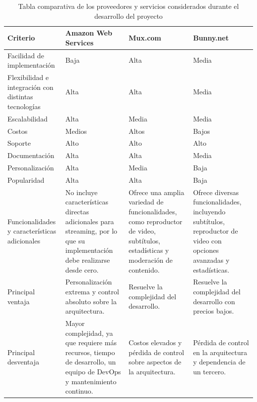 \begin{table}[!htbp]
    \centering
    \footnotesize
    \renewcommand{\arraystretch}{1.5}
    \setlength{\tabcolsep}{6pt}
    \begin{tabularx}{\textwidth}{|>{\Centering\arraybackslash}p{3.8cm}|>{\Centering\arraybackslash}X|>{\Centering\arraybackslash}X|>{\Centering\arraybackslash}X|}
        \hline
        \textbf{Criterio} & \textbf{Amazon Web Services} & \textbf{Mux.com} & \textbf{Bunny.net} \\
        \hline
        Facilidad de implementación & Baja & Alta & Media \\
        \hline
        Flexibilidad e integración con distintas tecnologías & Alta & Alta & Media \\
        \hline
        Escalabilidad & Alta & Media & Media \\
        \hline
        Costos & Medios & Altos & Bajos \\
        \hline
        Soporte & Alto & Alto & Alto \\
        \hline
        Documentación & Alta & Alta & Media \\
        \hline
        Personalización & Alta & Media & Baja \\
        \hline
        Popularidad & Alta & Alta & Baja \\
        \hline
        Funcionalidades y características adicionales 
        & No incluye características directas adicionales para streaming, por lo que su implementación debe realizarse desde cero.
        & Ofrece una amplia variedad de funcionalidades, como reproductor de video, subtítulos, estadísticas y moderación de contenido.
        & Ofrece diversas funcionalidades, incluyendo subtítulos, reproductor de video con opciones avanzadas y estadísticas. \\
        \hline
        Principal ventaja 
        & Personalización extrema y control absoluto sobre la arquitectura.
        & Resuelve la complejidad del desarrollo.
        & Resuelve la complejidad del desarrollo con precios bajos. \\
        \hline
        Principal desventaja 
        & Mayor complejidad, ya que requiere más recursos, tiempo de desarrollo, un equipo de DevOps y mantenimiento continuo.
        & Costos elevados y pérdida de control sobre aspectos de la arquitectura.
        & Pérdida de control en la arquitectura y dependencia de un tercero. \\
        \hline
    \end{tabularx}
    \caption{Tabla comparativa de los proveedores y servicios considerados durante el desarrollo del proyecto}
    \label{tab:comparativa-proveedores}
\end{table}



